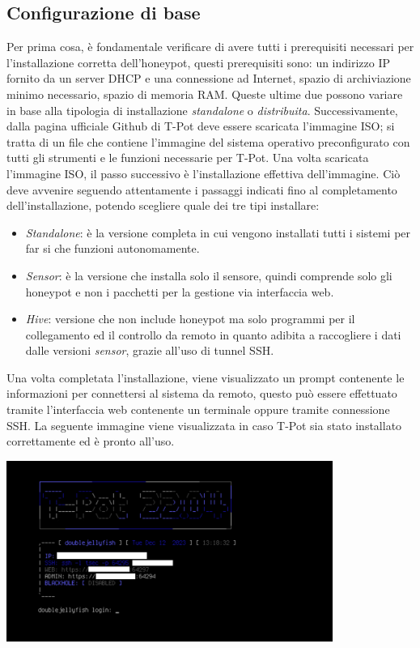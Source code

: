 \subsection{Configurazione di base}
Per prima cosa, è fondamentale verificare di avere tutti i prerequisiti necessari per l'installazione corretta dell'honeypot, questi prerequisiti sono: un indirizzo IP fornito da un server DHCP e una connessione ad Internet, spazio di archiviazione minimo necessario, spazio di memoria RAM. Queste ultime due possono variare in base alla tipologia di installazione \textit{standalone} o \textit{distribuita}. Successivamente, dalla pagina ufficiale Github di T-Pot deve essere scaricata l'immagine ISO; si tratta di un file che contiene l'immagine del sistema operativo preconfigurato con tutti gli strumenti e le funzioni necessarie per T-Pot. Una volta scaricata l'immagine ISO, il passo successivo è l'installazione effettiva dell'immagine. Ciò deve avvenire seguendo attentamente i passaggi indicati fino al completamento dell'installazione, potendo scegliere quale dei tre tipi installare:
\begin{itemize}
	\item \textit{Standalone}: è la versione completa in cui vengono installati tutti i sistemi per far si che funzioni autonomamente.
	\item \textit{Sensor}: è la versione che installa solo il sensore, quindi comprende solo gli honeypot e non i pacchetti per la gestione via interfaccia web.
	\item \textit{Hive}: versione che non include honeypot ma solo programmi per il collegamento ed il controllo da remoto in quanto adibita a raccogliere i dati dalle versioni \textit{sensor}, grazie all'uso di tunnel SSH.
\end{itemize}
Una volta completata l'installazione, viene visualizzato un prompt contenente le informazioni per connettersi al sistema da remoto, questo può essere effettuato tramite l'interfaccia web contenente un terminale oppure tramite connessione SSH. La seguente immagine viene visualizzata in caso T-Pot sia stato installato correttamente ed è pronto all'uso.\\
\begin{center}
	\includegraphics[width=0.8\textwidth]{image/fineInstallazione.png}
\end{center}
